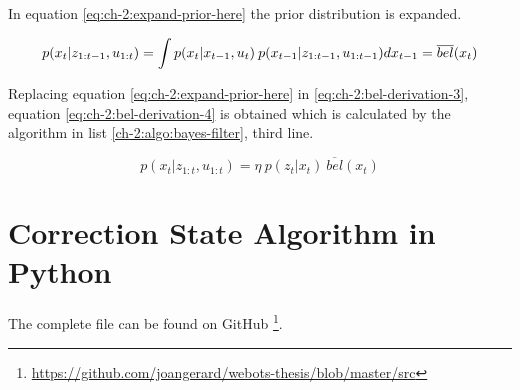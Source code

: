 In equation \ref{eq:ch-2:expand-prior-here} the prior distribution is expanded.

\begin{equation}\label{eq:ch-2:expand-prior-here}
p(x_t | z_{1:t-1}, u_{1:t}) = \int p(x_t | x_{t-1}, u_t) \: p(x_{t-1} | z_{1:t-1}, u_{1:t-1}) dx_{t-1}\\
= \overline{bel}(x_t)
\end{equation}

Replacing equation \ref{eq:ch-2:expand-prior-here} in \ref{eq:ch-2:bel-derivation-3}, equation \ref{eq:ch-2:bel-derivation-4} is obtained which is calculated by the algorithm in list \ref{ch-2:algo:bayes-filter}, third line.

\begin{equation}\label{eq:ch-2:bel-derivation-4}
p(x_t| z_{1:t}, u_{1:t}) = \eta \: p(z_t | x_t) \: \overline{bel}(x_t)
\end{equation}


\section{Correction State Algorithm in Python}\label{sec:ap:correction-state-algo}
The complete file can be found on GitHub
\footnote{\hyperref[obstacle_avoid_test.py]{https://github.com/joangerard/webots-thesis/blob/master/src}}.






















